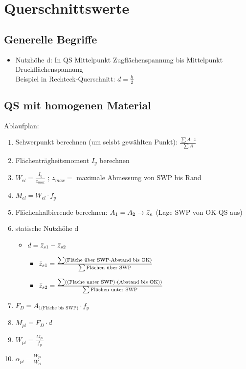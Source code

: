 \documentclass[fleqn,twoside]{article}
\begin{document}
\newpage

\section{Querschnittswerte}

    \subsection{Generelle Begriffe}

        \begin{itemize}
            \item Nutzhöhe d: In QS Mittelpunkt Zugflächenspannung bis Mittelpunkt Druckflächenspannung\\
                Beispiel in Rechteck-Querschnitt: $d=\frac{h}{2}$
        \end{itemize}

    \subsection{QS mit homogenen Material}
        Ablaufplan:
        \begin{enumerate}
            \item Schwerpunkt berechnen (um selsbt gewählten Punkt): $\frac{\sum A \cdot z}{\sum A}$
            \item Flächenträgheitsmoment $I_y$ berechnen
            \item $W_{el} = \frac{I_y}{z_{max}}$ ; $z_{max} = $ maximale Abmessung von SWP bis Rand
            \item $M_{el} = W_{el} \cdot f_y$
            \item Flächenhalbierende berechnen: $A_1 = A_2 \rightarrow \Bar{z}_n$ (Lage SWP von OK-QS aus)
            \item statische Nutzhöhe d
                \begin{itemize}
                    \item $d=\Bar{z}_{s1}-\Bar{z}_{s2}$
                        \begin{itemize}
                            \item $\Bar{z}_{s1} = \frac{\sum (\text{Fläche über SWP}  \cdot \text{Abstand bis OK})}{\sum \text{Flächen über SWP}}$
                            \item $\Bar{z}_{s2} = \frac{\sum (\text{(Fläche unter SWP)}  \cdot \text{(Abstand bis OK)})}{\sum \text{Flächen unter SWP}}$
                        \end{itemize}
                \end{itemize}
            \item $F_D = A_{1 \text{(Fläche bis SWP)}} \cdot f_y$
            \item $M_{pl} = F_D \cdot d$
            \item $W_{pl} = \frac{M_{pl}}{f_y}$
            \item $\alpha_{pl} = \frac{W_{pl}}{W_{el}}$
        \end{enumerate}
\end{document}
